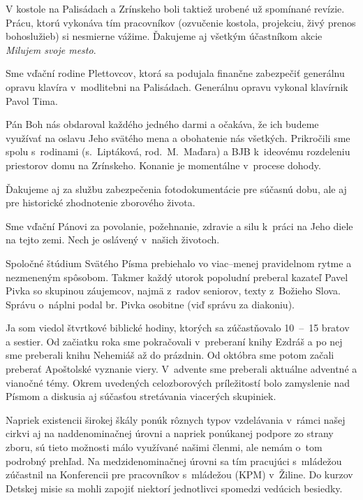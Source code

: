 V kostole na Palisádach a Zrínskeho boli taktiež urobené už spomínané revízie. Prácu, ktorú vykonáva tím pracovníkov (ozvučenie kostola, projekciu, živý prenos bohoslužieb) si nesmierne vážime. Ďakujeme aj všetkým účastníkom akcie {\it Milujem svoje mesto}.

Sme vďační rodine Plettovcov, ktorá sa podujala finančne zabezpečiť generálnu opravu klavíra v~modlitebni na Palisádach. Generálnu opravu vykonal klavírnik Pavol Tima.

Pán Boh nás obdaroval každého jedného darmi a očakáva, že ich budeme využívať na oslavu Jeho svätého mena a obohatenie nás všetkých. Prikročili sme spolu s~rodinami (s.~Liptáková, rod.~M.~Maďara) a BJB k~ideovému rozdeleniu priestorov domu na Zrínskeho. Konanie je momentálne v~procese dohody.

Ďakujeme aj za službu zabezpečenia fotodokumentácie pre súčasnú dobu, ale aj pre historické zhodnotenie zborového života.

Sme vďační Pánovi za povolanie, požehnanie, zdravie a silu k~práci na Jeho diele na tejto zemi. Nech je oslávený v~našich životoch.



Spoločné štúdium Svätého Písma prebiehalo vo viac--menej pravidelnom rytme a nezmeneným spôsobom. Takmer každý utorok popoludní preberal kazateľ Pavel Pivka so skupinou záujemcov, najmä z~radov seniorov, texty z~Božieho Slova. Správu o~náplni podal br. Pivka osobitne (viď správu za diakoniu).

Ja som viedol štvrtkové biblické hodiny, ktorých sa zúčastňovalo 10~--~15 bratov a sestier. Od začiatku roka sme pokračovali v~preberaní knihy Ezdráš a po nej sme preberali knihu Nehemiáš až do prázdnin. Od októbra sme potom začali preberať Apoštolské vyznanie viery. V~advente sme preberali aktuálne adventné a vianočné témy. Okrem uvedených celozborových príležitostí bolo zamyslenie nad Písmom a diskusia aj súčasťou stretávania viacerých skupiniek.

Napriek existencii širokej škály ponúk rôznych typov vzdelávania v~rámci našej cirkvi aj na naddenominačnej úrovni a napriek ponúkanej podpore zo strany zboru, sú tieto možnosti málo využívané našimi členmi, ale nemám o~tom podrobný prehľad. Na medzidenominačnej úrovni sa tím pracujúci s~mládežou zúčastnil na Konferencii pre pracovníkov s~mládežou (KPM) v~Žiline. Do kurzov Detskej misie sa mohli zapojiť niektorí jednotlivci spomedzi vedúcich besiedky.

